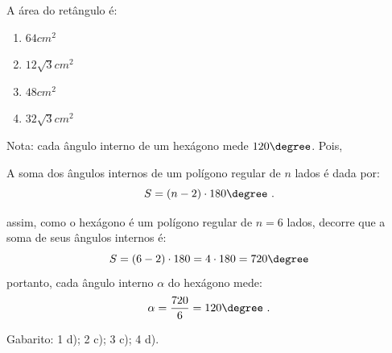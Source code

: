 \begin{enumerate}
  A área do retângulo é:
  \begin{enumerate}
  \item $64cm^2$
  \item $12\sqrt{3}cm^2$
  \item $48cm^2$
  \item $32\sqrt{3}cm^2$
 \end{enumerate}

 {\color{red} Nota:} cada ângulo interno de um hexágono mede $120\degree$.
 Pois,
 \vskip0.3cm
\colorbox{azul}{
 \begin{minipage}{0.9\linewidth}
 \begin{center}
 A soma dos ângulos internos de um polígono regular de $n$ lados é dada por:
  \[S= (n-2)\cdot 180 \degree \ .\]
 \end{center}
 \end{minipage}}
 \vskip0.3cm
 assim, como o hexágono é um polígono regular de $n= 6$ lados, decorre que a soma de seus ângulos internos é:
 \[S= (6-2)\cdot 180= 4 \cdot 180= 720 \degree\]
 portanto, cada ângulo interno $\alpha$ do hexágono mede:
 \[\alpha= \frac{720}{6}= 120 \degree \ .\]


 \end{enumerate}

 Gabarito: 1 d); 2 c); 3 c); 4 d).
